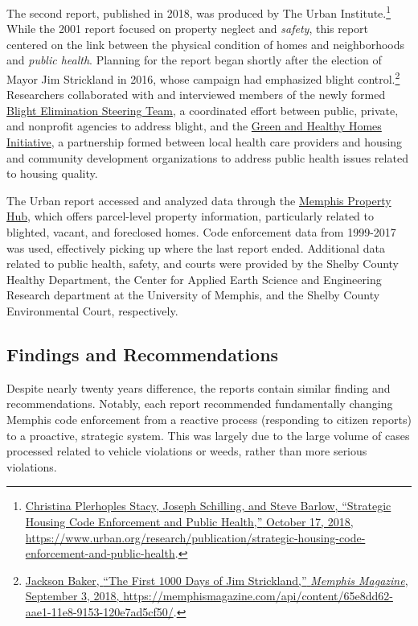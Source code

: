 \documentclass[
  openany]{book}
\begin{document}
The second report, published in 2018, was produced by The Urban Institute.\footnote{\protect\hyperlink{ref-stacy2018}{Christina Plerhoples Stacy, Joseph Schilling, and Steve Barlow, {``Strategic Housing Code Enforcement and Public Health,''} October 17, 2018, \url{https://www.urban.org/research/publication/strategic-housing-code-enforcement-and-public-health}}.} While the 2001 report focused on property neglect and \emph{safety}, this report centered on the link between the physical condition of homes and neighborhoods and \emph{public health}. Planning for the report began shortly after the election of Mayor Jim Strickland in 2016, whose campaign had emphasized blight control.\footnote{\protect\hyperlink{ref-baker2018}{Jackson Baker, {``The First 1000 Days of Jim Strickland,''} \emph{Memphis Magazine}, September 3, 2018, \url{https://memphismagazine.com/api/content/65e8dd62-aae1-11e8-9153-120e7ad5cf50/}}.} Researchers collaborated with and interviewed members of the newly formed \href{http://memphisfightsblight.com/blight-elimination-steering-team/}{Blight Elimination Steering Team}, a coordinated effort between public, private, and nonprofit agencies to address blight, and the \href{https://www.greenandhealthyhomes.org/location/memphis-tn/}{Green and Healthy Homes Initiative}, a partnership formed between local health care providers and housing and community development organizations to address public health issues related to housing quality.

The Urban report accessed and analyzed data through the \href{http://memphisfightsblight.com/programs/mph/}{Memphis Property Hub}, which offers parcel-level property information, particularly related to blighted, vacant, and foreclosed homes. Code enforcement data from 1999-2017 was used, effectively picking up where the last report ended. Additional data related to public health, safety, and courts were provided by the Shelby County Healthy Department, the Center for Applied Earth Science and Engineering Research department at the University of Memphis, and the Shelby County Environmental Court, respectively.

\hypertarget{findings-and-recommendations}{%
\subsection{Findings and Recommendations}\label{findings-and-recommendations}}

Despite nearly twenty years difference, the reports contain similar finding and recommendations. Notably, each report recommended fundamentally changing Memphis code enforcement from a reactive process (responding to citizen reports) to a proactive, strategic system. This was largely due to the large volume of cases processed related to vehicle violations or weeds, rather than more serious violations.
\end{document}

